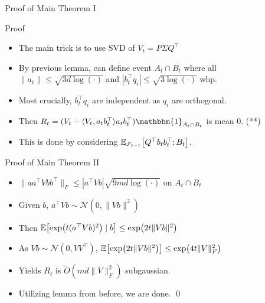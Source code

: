 \documentclass[10pt]{beamer}
\newcommand{\mg}[1]{\| #1 \|}
\newcommand{\E}{\mathbb{E}\qty}
\newcommand{\Et}{\mathbb{E}_{\mathcal F_{t-1}} \qty}
\newcommand{\1}{\mathbbm{1}}
\begin{document}
\begin{frame}{Proof of Main Theorem I}
    \begin{block}{Proof}
    \begin{itemize}
        \item The main trick is to use SVD of $V_t = P \Sigma Q^\top$
        \item By previous lemma, can define event $A_t \cap B_t$ where all $\mg{a_t} \leq \sqrt{3d \log(\cdot)}$ and $|b_t^\top q_i| \leq \sqrt{3 \log(\cdot)}$ whp.
        \item Most crucially, $b_t^\top q_i$ are independent as $q_i$ are orthogonal.
        \item Then $R_t = (V_t - \langle V_t, a_tb_t^\top \rangle a_t b_t^\top)\1_{A_t \cap B_t}$ is mean 0. (**)
        \item This is done by considering $\Et[Q^\top b_t b_t^\top ; B_t]$.
        \end{itemize}
        \end{block}
    \end{frame}
    \begin{frame}{Proof of Main Theorem II}
        \begin{itemize}
        \item $\mg{aa^\top V bb^\top}_F \leq |a^\top V b| \sqrt{9md \log(\cdot)}$ on $A_t \cap B_t$
        \item Given $b$, $a^\top V b \sim \mathcal N(0, \mg{Vb}^2)$
        \item Then $\E[\exp(t(a^\top Vb)^2) \mid b] \leq \exp(2t \mg{Vb}^2)$
        \item As $Vb \sim \mathcal N(0, VV^\top)$, $\E[\exp(2t \mg{Vb}^2)] \leq \exp(4t \mg{V}_F^2)$
        \item Yields $R_t$ is $\tilde O(md \mg{V}_F^2)$ subgaussian.
        \item Utilizing lemma from before, we are done. \qed
    \end{itemize}
\end{frame}
\end{document}
